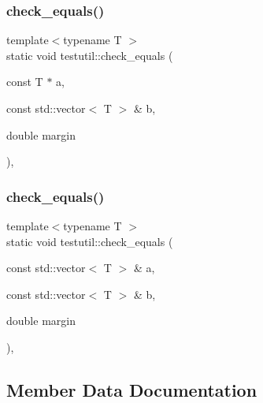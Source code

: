 \mbox{\label{structtestutil_ac6df0159fd0afd6752f5fb21c579475c}} 
\subsubsection{\texorpdfstring{check\+\_\+equals()}{check\_equals()}\hspace{0.1cm}{\footnotesize\ttfamily [3/4]}}
{\footnotesize\ttfamily template$<$typename T $>$ \\
static void testutil\+::check\+\_\+equals (\begin{DoxyParamCaption}\item[{const T $\ast$}]{a,  }\item[{const std\+::vector$<$ T $>$ \&}]{b,  }\item[{double}]{margin }\end{DoxyParamCaption})\hspace{0.3cm}{\ttfamily [inline]}, {\ttfamily [static]}}

\mbox{\label{structtestutil_a4a2928638dfe295138a445d142ea83de}} 
\subsubsection{\texorpdfstring{check\+\_\+equals()}{check\_equals()}\hspace{0.1cm}{\footnotesize\ttfamily [4/4]}}
{\footnotesize\ttfamily template$<$typename T $>$ \\
static void testutil\+::check\+\_\+equals (\begin{DoxyParamCaption}\item[{const std\+::vector$<$ T $>$ \&}]{a,  }\item[{const std\+::vector$<$ T $>$ \&}]{b,  }\item[{double}]{margin }\end{DoxyParamCaption})\hspace{0.3cm}{\ttfamily [inline]}, {\ttfamily [static]}}



\subsection{Member Data Documentation}
\mbox{\label{structtestutil_a9fc0c46780b519e3e09e38337058ae3d}} 

